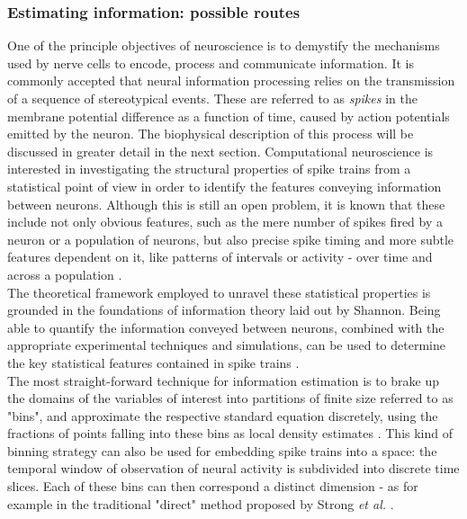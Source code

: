\documentclass[12pt]{extarticle}
\begin{document}
\subsubsection*{Estimating information: possible routes}
\noindent
One of the principle objectives of neuroscience is to demystify the mechanisms used by nerve cells to encode, process and communicate information. It is commonly accepted that neural information processing relies on the transmission of a sequence of stereotypical events. These are referred to as \textit{spikes} in the membrane potential difference as a function of time, caused by action potentials emitted by the neuron. The biophysical description of this process will be discussed in greater detail in the next section. Computational neuroscience is interested in investigating the structural properties of spike trains from a statistical point of view in order to identify the features conveying information between neurons. Although this is still an open problem, it is known that these include not only obvious features, such as the mere number of spikes fired by a neuron or a population of neurons, but also precise spike timing and more subtle features dependent on it, like patterns of intervals or activity - over time and across a population \cite{VJ02}.\\ 

\noindent
The theoretical framework employed to unravel these statistical properties is grounded in the foundations of information theory laid out by Shannon. Being able to quantify the information conveyed between neurons, combined with the appropriate experimental techniques and simulations, can be used to determine the key statistical features contained in spike trains \cite{VJ02}.\\

\noindent
The most straight-forward technique for information estimation is to brake up the domains of the variables of interest into partitions of finite size referred to as "bins", and approximate the respective standard equation discretely, using the fractions of points falling into these bins as local density estimates \cite{KRAS}. This kind of binning strategy can also be used for embedding spike trains into a space: the temporal window of observation of neural activity is subdivided into discrete time slices. Each of these bins can then correspond a distinct dimension - as for example in the traditional "direct" method proposed by Strong \textit{et al.} \cite{STRONG}.\\
\end{document}
